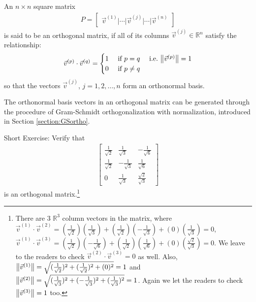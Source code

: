 \begin{defn}
\label{defn:orthomatrix}
An $n \times n$ square matrix
\begin{align*}
P = \begin{bmatrix}
\vec{v}^{(1)}|\cdots|\vec{v}^{(j)}|\cdots|\vec{v}^{(n)}   
\end{bmatrix}
\end{align*}
is said to be an orthogonal matrix, if all of its columns $\vec{v}^{(j)} \in \mathbb{R}^n$ satisfy the relationship:
\begin{align*}
\vec{v}^{(p)} \cdot \vec{v}^{(q)} =
\begin{cases}
1 &\text{ if } p = q \quad \text{ i.e.\ } \norm{\vec{v}^{(p)}} = 1 \\
0 &\text{ if } p \neq q    
\end{cases}
\end{align*}
so that the vectors $\vec{v}^{(j)}$, $j=1,2,\ldots,n$ form an orthonormal basis.
\end{defn}
The orthonormal basis vectors in an orthogonal matrix can be generated through the procedure of Gram-Schmidt orthogonalization with normalization, introduced in Section \ref{section:GSortho}.\par
Short Exercise: Verify that 
\begin{align*}
\begin{bmatrix}
\frac{1}{\sqrt{2}} & \frac{1}{\sqrt{3}} & -\frac{1}{\sqrt{6}} \\
\frac{1}{\sqrt{2}} & -\frac{1}{\sqrt{3}} & \frac{1}{\sqrt{6}} \\
0 & \frac{1}{\sqrt{3}} & \frac{\sqrt{2}}{\sqrt{3}}
\end{bmatrix}
\end{align*}
is an orthogonal matrix.\footnote{There are $3$ $\mathbb{R}^3$ column vectors in the matrix, where $\vec{v}^{(1)} \cdot \vec{v}^{(2)} = (\frac{1}{\sqrt{2}})(\frac{1}{\sqrt{3}}) + (\frac{1}{\sqrt{2}})(-\frac{1}{\sqrt{3}}) + (0)(\frac{1}{\sqrt{3}}) = 0$, $\vec{v}^{(1)} \cdot \vec{v}^{(3)} = (\frac{1}{\sqrt{2}})(-\frac{1}{\sqrt{6}}) + (\frac{1}{\sqrt{2}})(\frac{1}{\sqrt{6}}) + (0)(\frac{\sqrt{2}}{\sqrt{3}}) = 0$. We leave to the readers to check $\vec{v}^{(2)} \cdot \vec{v}^{(3)} = 0$ as well. Also, $\norm{\vec{v}^{(1)}} = \sqrt{(\frac{1}{\sqrt{2}})^2 + (\frac{1}{\sqrt{2}})^2 + (0)^2} = 1$ and $\norm{\vec{v}^{(2)}} = \sqrt{(\frac{1}{\sqrt{3}})^2 + (-\frac{1}{\sqrt{3}})^2 + (\frac{1}{\sqrt{3}})^2} = 1$. Again we let the readers to check $\norm{\vec{v}^{(3)}} = 1$ too.}\par
